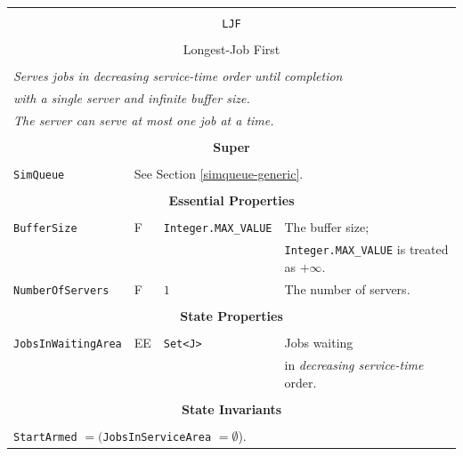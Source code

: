 \documentclass[12pt]{book}
\begin{document}
\begin{tabular}{|l|l|l|l|}
\hline
\multicolumn{4}{|c|}{} \\
\multicolumn{4}{|c|}{\lstinline[basicstyle=\large]{LJF}} \\
\multicolumn{4}{|c|}{} \\
\multicolumn{4}{|c|}{Longest-Job First} \\
\multicolumn{4}{|c|}{} \\
\hline
\multicolumn{4}{|l|}{\em Serves jobs in decreasing service-time order until completion} \\
\multicolumn{4}{|l|}{\em with a single server and infinite buffer size.} \\
\multicolumn{4}{|l|}{\em The server can serve at most one job at a time.} \\
\hline
\multicolumn{4}{|c|}{} \\
\multicolumn{4}{|c|}{\bf Super} \\
\multicolumn{4}{|c|}{} \\
\hline
\lstinline|SimQueue| & \multicolumn{3}{|l|}{See Section \ref{simqueue-generic}.} \\
\hline
\multicolumn{4}{|c|}{} \\
\multicolumn{4}{|c|}{\bf Essential Properties} \\
\multicolumn{4}{|c|}{} \\
\hline
\lstinline|BufferSize|      & F & \lstinline|Integer.MAX_VALUE|
                            & The buffer size; \\
                        & & & \lstinline|Integer.MAX_VALUE| is treated as $+\infty$. \\
\hline
\lstinline|NumberOfServers| & F & $1$
                            & The number of servers. \\
\hline
\multicolumn{4}{|c|}{} \\
\multicolumn{4}{|c|}{\bf State  Properties} \\
\multicolumn{4}{|c|}{} \\
\hline
\lstinline|JobsInWaitingArea| & EE & \lstinline|Set<J>| & Jobs waiting \\
                              &    &                    & in {\em decreasing service-time\/} order. \\
\hline
\multicolumn{4}{|c|}{} \\
\multicolumn{4}{|c|}{\bf State  Invariants} \\
\multicolumn{4}{|c|}{} \\
\hline
\multicolumn{4}{|l|}{\lstinline|StartArmed| $= ($\lstinline|JobsInServiceArea| $= \emptyset$).} \\

\end{tabular}
\end{document}
